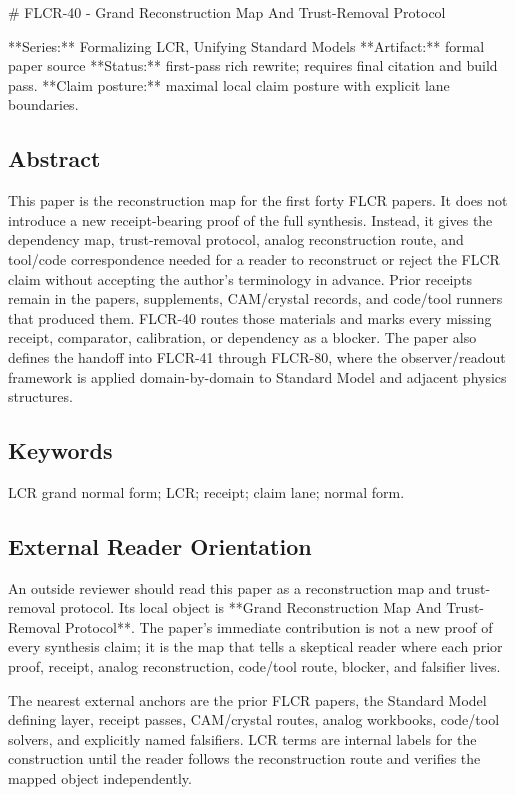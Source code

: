 \documentclass[11pt]{article}
\begin{document}
﻿\# FLCR-40 - Grand Reconstruction Map And Trust-Removal Protocol

**Series:** Formalizing LCR, Unifying Standard Models
**Artifact:** formal paper source
**Status:** first-pass rich rewrite; requires final citation and build pass.
**Claim posture:** maximal local claim posture with explicit lane boundaries.

\subsection*{Abstract}

This paper is the reconstruction map for the first forty FLCR papers. It does not introduce a new receipt-bearing proof of the full synthesis. Instead, it gives the dependency map, trust-removal protocol, analog reconstruction route, and tool/code correspondence needed for a reader to reconstruct or reject the FLCR claim without accepting the author's terminology in advance. Prior receipts remain in the papers, supplements, CAM/crystal records, and code/tool runners that produced them. FLCR-40 routes those materials and marks every missing receipt, comparator, calibration, or dependency as a blocker. The paper also defines the handoff into FLCR-41 through FLCR-80, where the observer/readout framework is applied domain-by-domain to Standard Model and adjacent physics structures.


\subsection*{Keywords}

LCR grand normal form; LCR; receipt; claim lane; normal form.

\subsection*{External Reader Orientation}

An outside reviewer should read this paper as a reconstruction map and trust-removal protocol. Its local object is **Grand Reconstruction Map And Trust-Removal Protocol**. The paper's immediate contribution is not a new proof of every synthesis claim; it is the map that tells a skeptical reader where each prior proof, receipt, analog reconstruction, code/tool route, blocker, and falsifier lives.

The nearest external anchors are the prior FLCR papers, the Standard Model defining layer, receipt passes, CAM/crystal routes, analog workbooks, code/tool solvers, and explicitly named falsifiers. LCR terms are internal labels for the construction until the reader follows the reconstruction route and verifies the mapped object independently.
\end{document}
